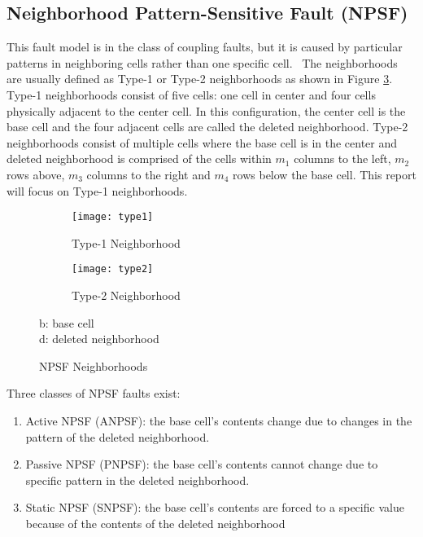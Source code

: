 \subsection{Neighborhood Pattern-Sensitive Fault (NPSF)}
\label{sec:npsf}
This fault model is in the class of coupling faults, but it is caused by particular patterns in neighboring cells rather than one specific cell.  The neighborhoods are usually defined as Type-1 or Type-2 neighborhoods \cite{1047051} as shown in Figure \ref{fig:npsftypes}.  Type-1 neighborhoods consist of five cells: one cell in center and four cells physically adjacent to the center cell.  In this configuration, the center cell is the base cell and the four adjacent cells are called the deleted neighborhood.  Type-2 neighborhoods consist of multiple cells where the base cell is in the center and deleted neighborhood is comprised of the cells within $m_1$ columns to the left, $m_2$ rows above, $m_3$ columns to the right and $m_4$ rows below the base cell.  This report will focus on Type-1 neighborhoods.

\begin{figure}[h!]
  \centering
  \begin{subfigure}[b]{0.4\textwidth}
    \texttt{[image: type1]}
    \caption{Type-1 Neighborhood}
    \label{fig:type1}
  \end{subfigure}
  \begin{subfigure}[b]{0.4\textwidth}
    \texttt{[image: type2]}
    \caption{Type-2 Neighborhood}
    \label{fig:type2}
  \end{subfigure}
  \caption[NPSF Neighborhoods]{NPSF Neighborhoods} 
           b: base cell \\
           d: deleted neighborhood 
  \label{fig:npsftypes}
\end{figure}

Three classes of NPSF faults exist:
\begin{enumerate}
  \item Active NPSF (ANPSF): the base cell's contents change due to changes in the pattern of the deleted neighborhood.
  \item Passive NPSF (PNPSF): the base cell's contents cannot change due to specific pattern in the deleted neighborhood.
  \item Static NPSF (SNPSF): the base cell's contents are forced to a specific value because of the contents of the deleted neighborhood
\end{enumerate}

